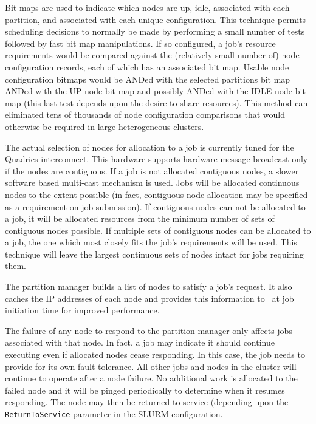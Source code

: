 \documentclass[10pt,onecolumn,times]{../common/llncs}
\begin{document}
{Bit maps are used to indicate which nodes are up, idle, associated
with each partition, and associated with each unique configuration.
This technique permits scheduling decisions to normally be made by
performing a small number of tests followed by fast bit map manipulations.
If so configured, a job's resource requirements would be compared against
the (relatively small number of) node configuration records, each of
which has an associated bit map. Usable node configuration bitmaps would
be ANDed with the selected partitions bit map ANDed with the UP node
bit map and possibly ANDed with the IDLE node bit map (this last test
depends upon the desire to share resources).  This method can eliminated
tens of thousands of node configuration comparisons that would otherwise
be required in large heterogeneous clusters.

The actual selection of nodes for allocation to a job is currently tuned
for the Quadrics interconnect.  This hardware supports hardware message
broadcast only if the nodes are contiguous.  If a job is not allocated
contiguous nodes, a slower software based multi-cast mechanism is used.
Jobs will be allocated continuous nodes to the extent possible (in
fact, contiguous node allocation may be specified as a requirement on
job submission).  If contiguous nodes can not be allocated to a job, it
will be allocated resources from the minimum number of sets of contiguous
nodes possible.  If multiple sets of contiguous nodes can be allocated
to a job, the one which most closely fits the job's requirements will
be used.  This technique will leave the largest continuous sets of nodes
intact for jobs requiring them.

The partition manager builds a list of nodes to satisfy a job's request.
It also caches the IP addresses of each node and provides this information
to \srun\ at job initiation time for improved performance.

The failure of any node to respond to the partition manager only affects
jobs associated with that node.  In fact, a job may indicate it should
continue executing even if allocated nodes cease responding.  In this
case, the job needs to provide for its own fault-tolerance.  All other
jobs and nodes in the cluster will continue to operate after a node
failure.  No additional work is allocated to the failed node and it will
be pinged periodically to determine when it resumes responding. The node
may then be returned to service (depending upon the {\tt ReturnToService}
parameter in the SLURM configuration.

}
\end{document}
